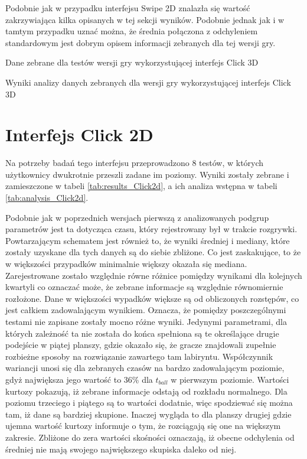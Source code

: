 \documentclass[a4paper,12pt,numbers=noenddot]{report}
\begin{document}
Podobnie jak w przypadku interfejsu Swipe 2D znalazła się wartość zakrzywiająca kilka opisanych w tej sekcji wyników. Podobnie jednak jak i w tamtym przypadku uznać można, że średnia połączona z odchyleniem standardowym jest dobrym opisem informacji zebranych dla tej wersji gry. 

\begin{table}
  \caption{Dane zebrane dla testów wersji gry wykorzystującej interfejs Click 3D}
  \resizebox{0.9\textwidth}{!}{%
	
  }
  \label{tab:results_Click3d}%
  \caption{Wyniki analizy danych zebranych dla wersji gry wykorzystującej interfejs Click 3D}
  \resizebox{0.9\textwidth}{!}{%
	
  }
  \label{tab:analysis_Click3d}%
\end{table}%


\section{Interfejs Click 2D}%
Na potrzeby badań tego interfejsu przeprowadzono 8 testów, w których użytkownicy dwukrotnie przeszli zadane im poziomy. Wyniki zostały zebrane i zamieszczone w tabeli \ref{tab:results_Click2d}, a ich analiza wstępna w tabeli \ref{tab:analysis_Click2d}.

Podobnie jak w poprzednich wersjach pierwszą z analizowanych podgrup parametrów jest ta dotycząca czasu, który rejestrowany był w trakcie rozgrywki. Powtarzającym schematem jest również to, że wyniki średniej i mediany, które zostały uzyskane dla tych danych są do siebie zbliżone. Co jest zaskakujące, to że w większości przypadków minimalnie większy okazała się mediana. Zarejestrowane zostało względnie równe różnice pomiędzy wynikami dla kolejnych kwartyli co oznaczać może, że zebrane informacje są względnie równomiernie rozłożone. Dane w większości wypadków większe są od obliczonych rozstępów, co jest całkiem zadowalającym wynikiem. Oznacza, że pomiędzy poszczególnymi testami nie zapisane zostały mocno różne wyniki. Jedynymi parametrami, dla których zależność ta nie została do końca spełniona są te określające drugie podejście w piątej planszy, gdzie okazało się, że gracze znajdowali zupełnie rozbieżne sposoby na rozwiązanie zawartego tam labiryntu. Współczynnik wariancji unosi się dla zebranych czasów na bardzo zadowalającym poziomie, gdyż największa jego wartość to 36\% dla $t_{ball}$ w pierwszym poziomie. Wartości kurtozy pokazują, iż zebrane informacje odstają od rozkładu normalnego. Dla poziomu trzeciego i piątego są to wartości dodatnie, więc spodziewać się można tam, iż dane są bardziej skupione. Inaczej wygląda to dla planszy drugiej gdzie ujemna wartość kurtozy informuje o tym, że rozciągają się one na większym zakresie. Zbliżone do zera wartości skośności oznaczają, iż obecne odchylenia od średniej nie mają swojego największego skupiska daleko od niej.
\end{document}
